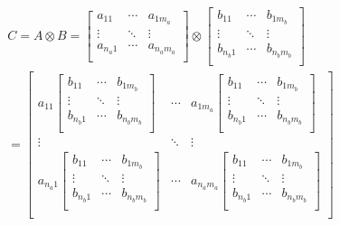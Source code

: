 \begin{align*}
    C = A \otimes B =
    \begin{bmatrix}
        a_{11} & \cdots & a_{1m_a} \\
        \vdots & \ddots  & \vdots \\
        a_{n_a1} & \cdots  & a_{n_am_a} \\
    \end{bmatrix}
    \otimes
    \begin{bmatrix}
        b_{11} & \cdots & b_{1m_b} \\
        \vdots & \ddots  & \vdots \\
        b_{n_b1} & \cdots  & b_{n_bm_b} \\
    \end{bmatrix} \\
    =
    \begin{bmatrix}
        a_{11}\begin{bmatrix}
            b_{11} & \cdots & b_{1m_b} \\
            \vdots & \ddots  & \vdots \\
            b_{n_b1} & \cdots  & b_{n_bm_b} \\
        \end{bmatrix} 
        & \cdots & a_{1m_a}\begin{bmatrix}
            b_{11} & \cdots & b_{1m_b} \\
            \vdots & \ddots  & \vdots \\
            b_{n_b1} & \cdots  & b_{n_bm_b} \\
        \end{bmatrix}
         \\
        \vdots & \ddots  & \vdots \\
        a_{n_a1}\begin{bmatrix}
            b_{11} & \cdots & b_{1m_b} \\
            \vdots & \ddots  & \vdots \\
            b_{n_b1} & \cdots  & b_{n_bm_b} \\
        \end{bmatrix} 
        & \cdots  & a_{n_am_a}\begin{bmatrix}
            b_{11} & \cdots & b_{1m_b} \\
            \vdots & \ddots  & \vdots \\
            b_{n_b1} & \cdots  & b_{n_bm_b} \\
        \end{bmatrix} \\

\end{bmatrix}
\end{align*}
